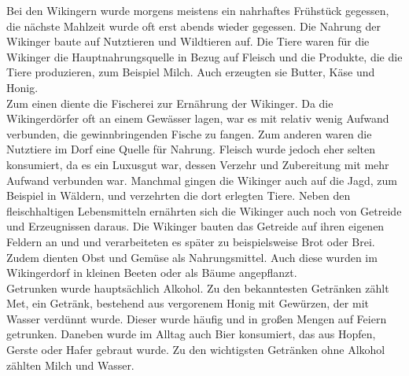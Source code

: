 \documentclass[12pt,a4paper,ngerman,openany]{book}
\begin{document}
Bei den Wikingern wurde morgens meistens ein nahrhaftes Frühstück gegessen, die nächste Mahlzeit wurde oft erst abends wieder gegessen. Die Nahrung der Wikinger baute auf Nutztieren und Wildtieren auf. Die Tiere waren für die Wikinger die Hauptnahrungsquelle in Bezug auf Fleisch und die Produkte, die die Tiere produzieren, zum Beispiel Milch. Auch erzeugten sie Butter, Käse und Honig. \\
Zum einen diente die Fischerei zur Ernährung der Wikinger. Da die Wikingerdörfer oft an einem Gewässer lagen, war es mit relativ wenig Aufwand verbunden, die gewinnbringenden Fische zu fangen. Zum anderen waren die Nutztiere im Dorf eine Quelle für Nahrung. Fleisch wurde jedoch eher selten konsumiert, da es ein Luxusgut war, dessen Verzehr und Zubereitung mit mehr Aufwand verbunden war. Manchmal gingen die Wikinger auch auf die Jagd, zum Beispiel in Wäldern, und verzehrten die dort erlegten Tiere.
Neben den fleischhaltigen Lebensmitteln ernährten sich die Wikinger auch noch von Getreide und Erzeugnissen daraus. Die Wikinger bauten das Getreide auf ihren eigenen Feldern an und und verarbeiteten es später zu beispielsweise Brot oder Brei. Zudem dienten Obst und Gemüse als Nahrungsmittel. Auch diese wurden im Wikingerdorf in kleinen Beeten oder als Bäume angepflanzt.\\
Getrunken wurde hauptsächlich Alkohol. Zu den bekanntesten Getränken zählt Met, ein Getränk, bestehend aus vergorenem Honig mit Gewürzen, der mit Wasser verdünnt wurde. Dieser wurde häufig und in großen Mengen auf Feiern getrunken. Daneben wurde im Alltag auch Bier konsumiert, das aus Hopfen, Gerste oder Hafer gebraut wurde. Zu den wichtigsten Getränken ohne Alkohol zählten Milch und Wasser.
\end{document}
